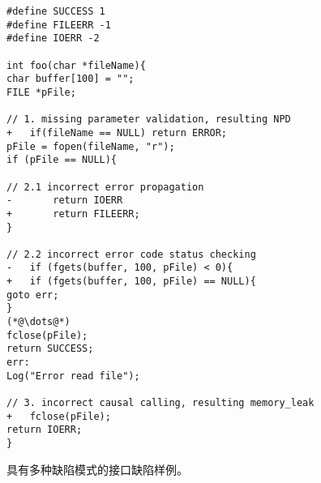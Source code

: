 \begin{figure}[t]
	\centering
\begin{lstlisting}
#define SUCCESS 1
#define FILEERR -1
#define IOERR -2		

int foo(char *fileName){
char buffer[100] = "";
FILE *pFile;

// 1. missing parameter validation, resulting NPD
+   if(fileName == NULL) return ERROR;
pFile = fopen(fileName, "r");
if (pFile == NULL){

// 2.1 incorrect error propagation
-       return IOERR
+       return FILEERR;
}

// 2.2 incorrect error code status checking
-   if (fgets(buffer, 100, pFile) < 0){
+   if (fgets(buffer, 100, pFile) == NULL){
goto err;
}
(*@\dots@*)
fclose(pFile);
return SUCCESS; 
err:
Log("Error read file");

// 3. incorrect causal calling, resulting memory_leak
+   fclose(pFile);
return IOERR;
}
\end{lstlisting}
	\caption{
	具有多种缺陷模式的接口缺陷样例。
	}
	\label{fig:2-4-example}
\end{figure}